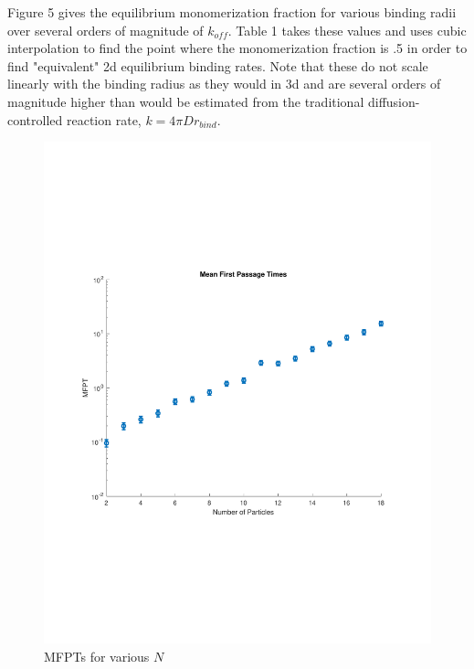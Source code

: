 \documentclass{article}
\begin{document}
Figure 5 gives the equilibrium monomerization fraction for various binding radii over several orders of magnitude of $k_{off}$. Table 1 takes these values and uses cubic interpolation to find the point where the monomerization fraction is .5 in order to find "equivalent" 2d equilibrium binding rates. Note that these do not scale linearly with the binding radius as they would in 3d and are several orders of magnitude higher than would be estimated from the traditional diffusion-controlled reaction rate, $k = 4 \pi D r_{bind}$.
\begin{figure}[h!]
\centering
\includegraphics[scale=0.5]{libsmolMFPT.pdf}
\caption{MFPTs for various $N$}
\label{fig:MFPT}
\end{figure}
\end{document}
